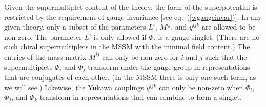\documentclass[12pt]{article}
\begin{document}
Given the supermultiplet content of the theory, the form of the
superpotential is restricted by the requirement of gauge invariance [see
eq.~(\ref{wgaugeinvar})].  In any given theory, only a subset of the
parameters $L^i$, $M^{ij}$, and $y^{ijk}$ are allowed to be non-zero.  The
parameter $L^i$ is only allowed if $\Phi_i$ is a gauge singlet. (There are
no such chiral supermultiplets in the MSSM with the minimal field
content.) The entries of the mass matrix $M^{ij}$ can only be non-zero for
$i$ and $j$ such that the supermultiplets $\Phi_i$ and $\Phi_j$ transform
under the gauge group in representations that are conjugates of each
other. (In the MSSM there is only one such term, as we will see.)
Likewise, the Yukawa couplings $y^{ijk}$ can only be non-zero when
$\Phi_i$, $\Phi_j$, and $\Phi_k$ transform in representations that can
combine to form a singlet. 
\end{document}
